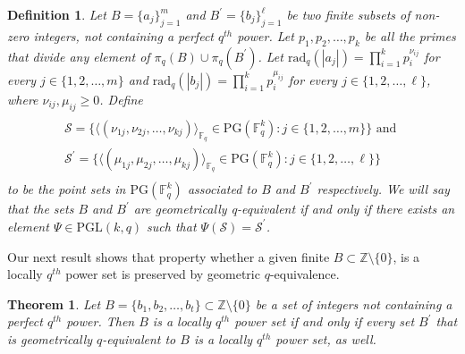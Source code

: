\documentclass[12pt]{amsart}
\newtheorem{theorem}{Theorem}[section]
\newtheorem{definition}{Definition}
\newcommand{\F}{{\mathbb F}}
\newcommand{\Z}{{\mathbb Z}}
\newcommand{\fq}{{\mathbb F}_{q}}
\newcommand{\PG}{\mathrm{PG}}
\begin{document}
\begin{definition}
Let $B = \{a_{j}\}_{j=1}^{m}$ and $B^{\prime} = \{b_{j}\}_{j=1}^{\ell}$ be two finite subsets of non-zero integers, not containing a perfect $q^{th}$ power. Let $p_{1}, p_{2}, \ldots, p_{k}$ be all the primes that divide any element of $\pi_{q}(B) \cup \pi_{q}(B^{\prime})$. Let $\text{rad}_{q}(|a_{j}|) = \prod_{i=1}^{k} p_{i}^{\nu_{ij}}$
for every $j\in\{1, 2, \ldots, m\}$ and $\text{rad}_{q}(|b_{j}|) = \prod_{i=1}^{k} p_{i}^{\mu_{ij}}$ for every  $j \in\{1, 2, \ldots, \ell\}$, where $\nu_{ij}, \mu_{ij} \geq 0$. Define 
\begin{multline*}
\\ \mathcal{S} = \big\{ \langle ( \nu_{1j}, \nu_{2j}, \ldots, \nu_{kj} )\rangle_{\fq} \in\PG(\F_{q}^{k}) : j\in\{1, 2, \ldots, m\} \big\} \text{ and }\\ \mathcal{S}^{\prime} = \big\{\langle (\mu_{1j}, \mu_{2j}, \ldots, \mu_{kj} ) \rangle_{\fq} \in\PG(\F_{q}^{k}) : j\in\{1, 2, \ldots, \ell\} \big\} \\
\end{multline*}
to be the point sets in $\PG(\mathbb{F}_{q}^{k})$ associated to $B$ and $B^{\prime}$ respectively. We will say that the sets $B$ and $B^{\prime}$ are \textit{geometrically q-equivalent} if and only if there exists an element $\Psi \in\mathrm{PGL}(k,q)$ such that $\Psi(\mathcal{S}) = \mathcal{S}^{\prime}$.
\end{definition}

Our next result shows that property whether a given finite $B\subset\mathbb{Z}\setminus\{0\}$, is a locally $q^{th}$ power set is preserved by geometric $q$-equivalence.  
\begin{theorem} \label{th:propertygeometricequiv}
    Let $B=\{b_1,b_2,\ldots,b_t\} \subset \Z \setminus \{0\}$ be a set of integers not containing a perfect $q^{th}$ power. Then $B$ is a locally $q^{th}$ power set if and only if every set $B^{\prime}$ that is geometrically $q$-equivalent to $B$ is a locally $q^{th}$ power set, as well. 
\end{theorem}
\end{document}
